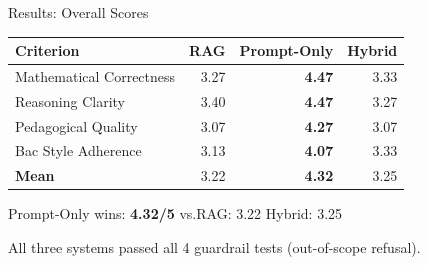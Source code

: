 \documentclass[aspectratio=169, 11pt]{beamer}
\begin{document}
\begin{frame}{Results: Overall Scores}

\begin{center}
\begin{tabular}{lrrr}
\toprule
\textbf{Criterion} & \textbf{RAG} & \textbf{Prompt-Only} & \textbf{Hybrid} \\
\midrule
Mathematical Correctness & 3.27 & \textbf{4.47} & 3.33 \\
Reasoning Clarity        & 3.40 & \textbf{4.47} & 3.27 \\
Pedagogical Quality      & 3.07 & \textbf{4.27} & 3.07 \\
Bac Style Adherence      & 3.13 & \textbf{4.07} & 3.33 \\
\midrule
\textbf{Mean}            & 3.22 & \textbf{4.32} & 3.25 \\
\bottomrule
\end{tabular}
\end{center}

\bigskip

\begin{center}
\large
Prompt-Only wins: \textbf{4.32/5} \quad vs.\quad RAG: 3.22 \quad Hybrid: 3.25
\end{center}

\bigskip

All three systems passed all 4 guardrail tests (out-of-scope refusal).

\end{frame}
\end{document}

